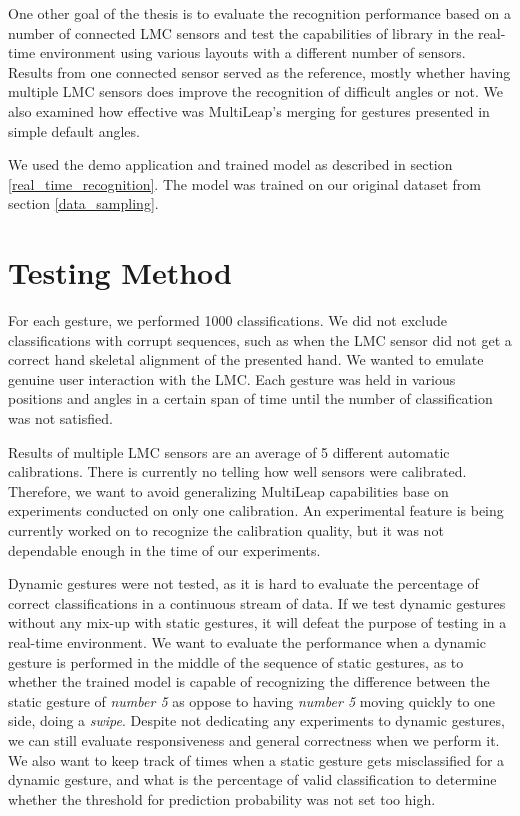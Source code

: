 
One other goal of the thesis is to evaluate the recognition performance based on a number of connected LMC sensors and test the capabilities of  library in the real-time environment using various layouts with a different number of sensors. Results from one connected sensor served as the reference, mostly whether having multiple LMC sensors does improve the recognition of difficult angles or not. We also examined how effective was MultiLeap's merging for gestures presented in simple default angles.

We used the demo application and trained model as described in section \ref{real_time_recognition}. The model was trained on our original dataset from section \ref{data_sampling}. 

\section{Testing Method}

For each gesture, we performed 1000 classifications. We did not exclude classifications with corrupt sequences, such as when the LMC sensor did not get a correct hand skeletal alignment of the presented hand. We wanted to emulate genuine user interaction with the LMC. Each gesture was held in various positions and angles in a certain span of time until the number of classification was not satisfied. 

Results of multiple LMC sensors are an average of 5 different automatic calibrations. There is currently no telling how well sensors were calibrated. Therefore, we want to avoid generalizing MultiLeap capabilities base on experiments conducted on only one calibration. An experimental feature is being currently worked on to recognize the calibration quality, but it was not dependable enough in the time of our experiments.

Dynamic gestures were not tested, as it is hard to evaluate the percentage of correct classifications in a continuous stream of data. If we test dynamic gestures without any mix-up with static gestures, it will defeat the purpose of testing in a real-time environment. We want to evaluate the performance when a dynamic gesture is performed in the middle of the sequence of static gestures, as to whether the trained model is capable of recognizing the difference between the static gesture of \textit{number 5} as oppose to having \textit{number 5} moving quickly to one side, doing a \textit{swipe}. Despite not dedicating any experiments to dynamic gestures, we can still evaluate responsiveness and general correctness when we perform it. We also want to keep track of times when a static gesture gets misclassified for a dynamic gesture, and what is the percentage of valid classification to determine whether the threshold for prediction probability was not set too high.


